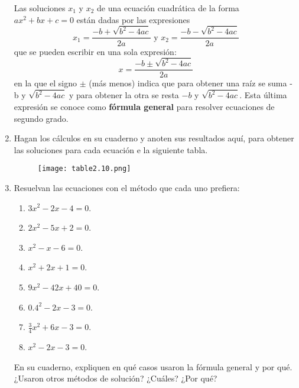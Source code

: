 \begin{enumerate}
          \begin{boxH}
              Las soluciones $x_1$ y $x_2$ de una ecuación cuadrática de la forma $ax^2 + bx + c = 0$ están dadas por las expresiones
              \[ x_1= \dfrac{-b+\sqrt{b^2-4ac}}{2a} \text{ y }  x_2= \dfrac{-b-\sqrt{b^2-4ac}}{2a}\]
              que se pueden escribir en una sola expresión:
              \[x= \dfrac{-b\pm\sqrt{b^2-4ac}}{2a}\]
              en la que el signo $\pm$ (más menos) indica que para obtener una raíz se suma - b y
              $\sqrt{b^2 - 4ac}$ y para obtener la otra se resta $- b$ y $\sqrt{b^2 - 4ac}$. Esta última expresión se
              conoce como \textbf{fórmula general} para resolver ecuaciones de segundo grado.
          \end{boxH}

          \newpage

    \item Hagan los cálculos en su cuaderno y anoten sus resultados aquí, para obtener las soluciones para cada ecuación e la siguiente tabla.

          \begin{figure}[H]
              \centering
              \texttt{[image: table2.10.png]}
              \label{tab:table2.10}
          \end{figure}

    \item Resuelvan las ecuaciones con el método que cada uno prefiera:

          \begin{enumerate}
              \item $3x^2  - 2x - 4 = 0$.
              \item $2x^2 - 5x + 2 = 0$.
              \item $x^2 - x - 6 = 0$.
              \item $x^2 + 2x + 1 = 0$.
              \item $9x^2 - 42x + 40 = 0$.
              \item $0.4^2 - 2x - 3 = 0$.
              \item $\frac{3}{4}x^2 + 6x - 3 = 0$.
              \item $x^2 - 2x - 3 = 0$.
          \end{enumerate}

          En su cuaderno, expliquen en qué casos usaron la fórmula general y por qué. ¿Usaron otros métodos de solución? ¿Cuáles? ¿Por qué?


\end{enumerate}
